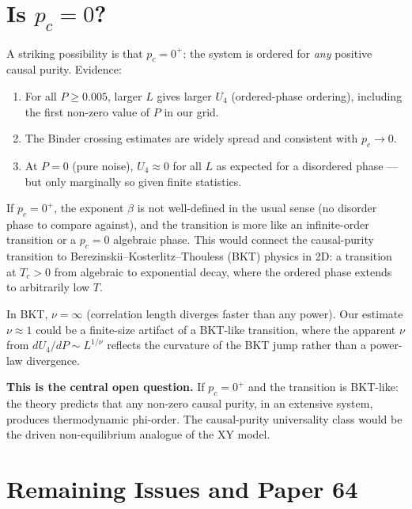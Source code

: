 \documentclass[12pt,a4paper]{article}
\begin{document}
\section{Is $p_c = 0$?}

A striking possibility is that $p_c = 0^+$:
the system is ordered for \emph{any} positive causal purity.
Evidence:
\begin{enumerate}
  \item For all $P \geq 0.005$, larger $L$ gives larger $U_4$ (ordered-phase ordering),
    including the first non-zero value of $P$ in our grid.
  \item The Binder crossing estimates are widely spread and consistent with
    $p_c \to 0$.
  \item At $P = 0$ (pure noise), $U_4 \approx 0$ for all $L$ as expected
    for a disordered phase --- but only marginally so given finite statistics.
\end{enumerate}

If $p_c = 0^+$, the exponent $\beta$ is not well-defined in the usual sense
(no disorder phase to compare against), and the transition is more like an
infinite-order transition or a $p_c = 0$ algebraic phase.
This would connect the causal-purity transition to
Berezinskii--Kosterlitz--Thouless (BKT) physics in 2D:
a transition at $T_c > 0$ from algebraic to exponential decay,
where the ordered phase extends to arbitrarily low $T$.

In BKT, $\nu = \infty$ (correlation length diverges faster than any power).
Our estimate $\nu \approx 1$ could be a finite-size artifact of a BKT-like transition,
where the apparent $\nu$ from $dU_4/dP \sim L^{1/\nu}$ reflects the curvature of
the BKT jump rather than a power-law divergence.

\textbf{This is the central open question.}
If $p_c = 0^+$ and the transition is BKT-like:
the theory predicts that any non-zero causal purity, in an extensive system,
produces thermodynamic phi-order.
The causal-purity universality class would be the driven non-equilibrium analogue
of the XY model.

\section{Remaining Issues and Paper 64}
\end{document}
